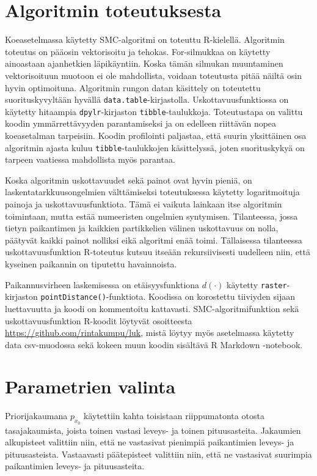 \documentclass[
  12pt,
  a4paper, twoside]{book}
\begin{document}
\section{Algoritmin toteutuksesta}

Koeasetelmassa käytetty SMC-algoritmi on toteuttu R-kielellä. Algoritmin toteutus on pääosin vektorisoitu ja tehokas. For-silmukkaa on käytetty ainoastaan ajanhetkien läpikäyntiin. Koska tämän silmukan muuntaminen vektorisoituun muotoon ei ole mahdollista, voidaan toteutusta pitää näiltä osin hyvin optimoituna. Algoritmin rungon datan käsittely on toteutettu suorituskyvyltään hyvällä \texttt{data.table}-kirjastolla. Uskottavuusfunktiossa on käytetty hitaampia \texttt{dpylr}-kirjaston \texttt{tibble}-taulukkoja. Toteutustapa on valittu koodin ymmärrettävyyden parantamiseksi ja on edelleen riittävän nopea koeasetalman tarpeisiin. Koodin profilointi paljastaa, että suurin yksittäinen osa algoritmin ajasta kuluu \texttt{tibble}-taulukkojen käsittelyssä, joten suorituskykyä on tarpeen vaatiessa mahdollista myös parantaa.

Koska algoritmin uskottavuudet sekä painot ovat hyvin pieniä, on laskentatarkkuusongelmien välttämiseksi toteutuksessa käytetty logaritmoituja painoja ja uskottavuusfunktiota. Tämä ei vaikuta lainkaan itse algoritmin toimintaan, mutta estää numeeristen ongelmien syntymisen. Tilanteessa, jossa tietyn paikantimen ja kaikkien partikkelien välinen uskottavuus on nolla, päätyvät kaikki painot nolliksi eikä algoritmi enää toimi. Tällaisessa tilanteessa uskottavuusfunktion R-toteutus kutsuu itseään rekursiivisesti uudelleen niin, että kyseinen paikannin on tiputettu havainnoista.

Paikannusvirheen laskemisessa on etäisyysfunktiona \(d(\cdot)\) käytetty \texttt{raster}-kirjaston \texttt{pointDistance()}-funktiota. Koodissa on korostettu tiiviyden sijaan luettavuutta ja koodi on kommentoitu kattavasti. SMC-algoritmifunktion sekä uskottavuusfunktion R-koodit löytyvät osoitteesta \url{https://github.com/rintakumpu/luk}, mistä löytyy myös asetelmassa käytetty data csv-muodossa sekä kokeen muun koodin sisältävä R Markdown -notebook.

\section{Parametrien valinta}

Priorijakaumana \(p_{x_0}\) käytettiin kahta toisistaan riippumatonta otosta tasajakaumista, joista toinen vastasi leveys- ja toinen pituusasteita. Jakaumien alkupisteet valittiin niin, että ne vastasivat pienimpiä paikantimien leveys- ja pituusasteista. Vastaavasti päätepisteet valittiin niin, että ne vastasivat suurimpia paikantimien leveys- ja pituusasteita.
\end{document}
